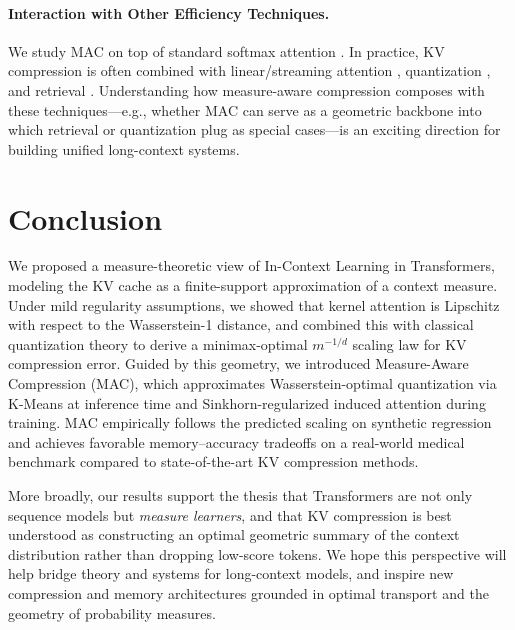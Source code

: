 \documentclass{article}
\theoremstyle{plain}
\theoremstyle{definition}
\theoremstyle{remark}
\begin{document}
\paragraph{Interaction with Other Efficiency Techniques.}
We study MAC on top of standard softmax attention \citep{vaswani2017attention}. In
practice, KV compression is often combined with linear/streaming attention
\citep{katharopoulos2020transformers,xiao2024efficient}, quantization
\citep{liu2024kivi}, and retrieval \citep{tang2024quest,gao2024retrieval}. Understanding
how measure-aware compression composes with these techniques—e.g., whether MAC can serve
as a geometric backbone into which retrieval or quantization plug as special cases—is an
exciting direction for building unified long-context systems.

\section{Conclusion}
\label{sec:conclusion}

We proposed a measure-theoretic view of In-Context Learning in Transformers, modeling the
KV cache as a finite-support approximation of a context measure. Under mild regularity
assumptions, we showed that kernel attention is Lipschitz with respect to the
Wasserstein-1 distance, and combined this with classical quantization theory to derive a
minimax-optimal $m^{-1/d}$ scaling law for KV compression error. Guided by this
geometry, we introduced Measure-Aware Compression (MAC), which approximates
Wasserstein-optimal quantization via K-Means at inference time and Sinkhorn-regularized
induced attention during training. MAC empirically follows the predicted scaling on
synthetic regression and achieves favorable memory–accuracy tradeoffs on a real-world
medical benchmark compared to state-of-the-art KV compression methods.

More broadly, our results support the thesis that Transformers are not only sequence
models but \emph{measure learners}, and that KV compression is best understood as
constructing an optimal geometric summary of the context distribution rather than
dropping low-score tokens. We hope this perspective will help bridge theory and systems
for long-context models, and inspire new compression and memory architectures grounded
in optimal transport and the geometry of probability measures.
\end{document}
